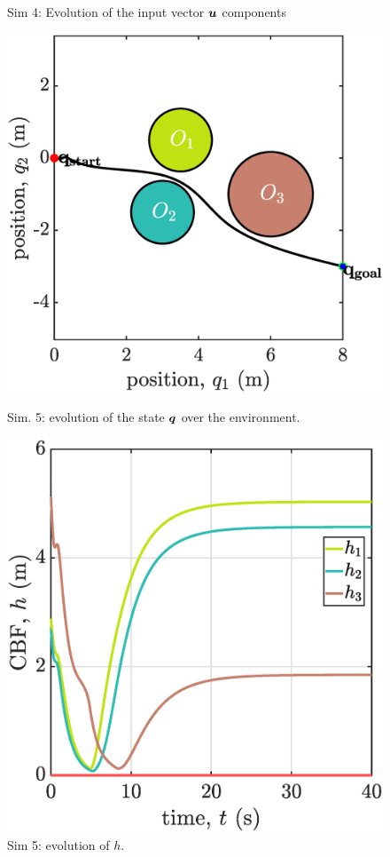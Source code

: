 \begin{figure}[!ht]
\begin{minipage}[t]{.45\textwidth}
    \end{minipage}  
    \caption{\label{fig:sim4u} Sim 4: Evolution of the input vector $\boldsymbol{u}$ components}
    \begin{minipage}[b]{0.46\linewidth}
    \includegraphics[width=\textwidth]{figures/sim5map.eps}
    \caption{\label{fig:sim5map}Sim. 5: evolution of the state ${\boldsymbol{q}}$ over the environment.}
    \end{minipage}
    \hfill
    \begin{minipage}[b]{0.46\linewidth}
    \includegraphics[width=\textwidth]{figures/sim5h.eps}
    \caption{\label{fig:sim5h}Sim 5: evolution of $h$.\\~}
    \end{minipage}
\end{figure}
\clearpage


